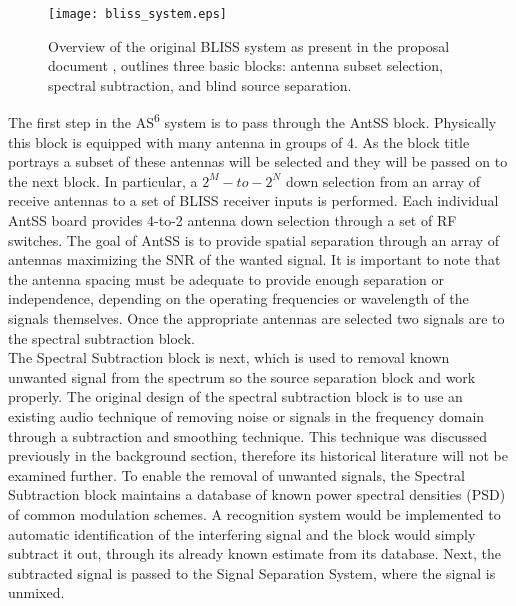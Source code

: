 \begin{figure}[!ht]
\hspace{0.2in}
\texttt{[image: bliss\_system.eps]}
\caption{Overview of the original BLISS system as present in the proposal document \cite{onr_original}, outlines three basic blocks: antenna subset selection, spectral subtraction, and blind source separation.}
\label{bliss_system}
\end{figure}

The first step in the AS\textsuperscript{6} system is to pass through the AntSS block.  Physically this block is equipped with many antenna in groups of 4.  As the block title portrays a subset of these antennas will be selected and they will be passed on to the next block.  In particular, a \(2^{M}-to-2^{N}\) down selection from an array of receive antennas to a set of BLISS receiver inputs is performed. Each individual AntSS board provides 4-to-2 antenna down selection through a set of RF switches.  The goal of AntSS is to provide spatial separation through an array of antennas maximizing the SNR of the wanted signal.  It is important to note that the antenna spacing must be adequate to provide enough separation or independence, depending on the operating frequencies or wavelength of the signals themselves.  Once the appropriate antennas are selected two signals are to the spectral subtraction block.\\

The Spectral Subtraction block is next, which is used to removal known unwanted signal from the spectrum so the source separation block and work properly.  The original design of the spectral subtraction block is to use an existing audio technique of removing noise or signals in the frequency domain through a subtraction and smoothing technique.  This technique was discussed previously in the background section, therefore its historical literature will not be examined further.  To enable the removal of unwanted signals, the Spectral Subtraction block maintains a database of known power spectral densities (PSD) of common modulation schemes.  A recognition system would be implemented to automatic identification of the interfering signal and the block would simply subtract it out, through its already known estimate from its database.  Next, the subtracted signal is passed to the Signal Separation System, where the signal is unmixed.\\

